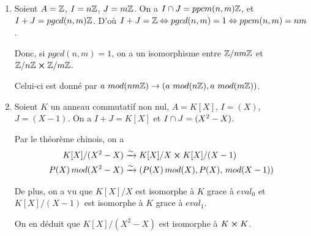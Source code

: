 \begin{exemple}
	\begin{enumerate}
		\item Soient $A = \mathbb{Z}$, $I = n \mathbb{Z}$, $J = m\mathbb{Z}$. On a $I
			\cap J = ppcm(n, m) \mathbb{Z}$, et $I + J = pgcd(n, m) \mathbb{Z}$.
			D'où $I + J = \mathbb{Z} \Leftrightarrow pgcd(n, m) = 1 \Leftrightarrow ppcm(n, m) =
			nm$.

			Donc, si $pgcd(n, m) = 1$, on a un isomorphisme entre $\mathbb{Z} / nm
			\mathbb{Z}$ et $\mathbb{Z} / n \mathbb{Z} \cross \mathbb{Z} / m
			\mathbb{Z}$.

			Celui-ci est donné par $a \, \, mod(nm \mathbb{Z}) \rightarrow (a \,
			\, mod(n
			\mathbb{Z}), a \, \, mod(m \mathbb{Z}))$.
		\item Soient $K$ un anneau commutatif non nul, $A = K[X]$, $I = (X)$, $J
			= (X - 1)$. On a $I + J = K[X]$ et $I \cap J = (X^{2} - X)$.

			Par le théorème chinois, on a
			\begin{align}
				K[X] / (X^{2} - X) & \xrightarrow{\sim} K[X] / X \cross K[X] / (X -
				1) \\
				P(X) \, mod(X^{2} - X) & \xrightarrow{\sim} (P(X) \, mod(X), P(X), \,
				mod(X - 1))
			\end{align}

			De plus, on a vu que $K[X] / X$ est isomorphe à $K$ grace à
			$eval_{0}$ et $K[X] / (X - 1)$ est isomorphe à $K$ grace à
			$eval_{1}$.

			On en déduit que $K[X] / (X^{2} - X)$ est isomorphe à $K \cross
			K$.
	\end{enumerate}
\end{exemple}



